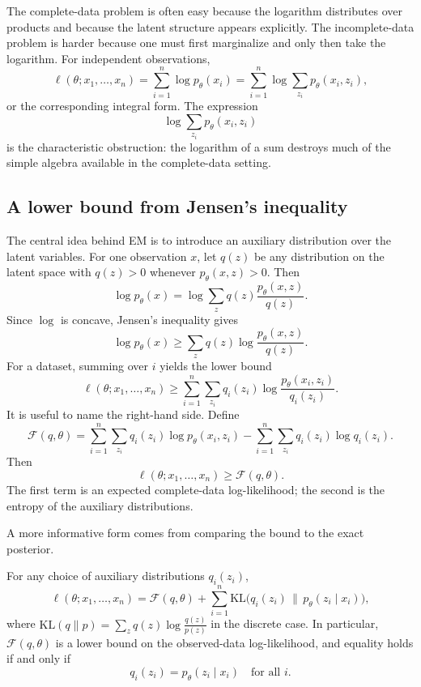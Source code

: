 The complete-data problem is often easy because the logarithm distributes over products and because the latent structure appears explicitly.
The incomplete-data problem is harder because one must first marginalize and only then take the logarithm.
For independent observations,
\[
\ell(\theta; x_1,\dots,x_n)=\sum_{i=1}^n \log p_\theta(x_i)
= \sum_{i=1}^n \log \sum_{z_i} p_\theta(x_i,z_i),
\]
or the corresponding integral form.
The expression
\[
\log \sum_{z_i} p_\theta(x_i,z_i)
\]
is the characteristic obstruction: the logarithm of a sum destroys much of the simple algebra available in the complete-data setting.

\subsection*{A lower bound from Jensen's inequality}

The central idea behind EM is to introduce an auxiliary distribution over the latent variables.
For one observation $x$, let $q(z)$ be any distribution on the latent space with $q(z)>0$ whenever $p_\theta(x,z)>0$.
Then
\[
\log p_\theta(x)
= \log \sum_z q(z)\frac{p_\theta(x,z)}{q(z)}.
\]
Since $\log$ is concave, Jensen's inequality gives
\[
\log p_\theta(x)
\geq
\sum_z q(z)\log \frac{p_\theta(x,z)}{q(z)}.
\]
For a dataset, summing over $i$ yields the lower bound
\[
\ell(\theta; x_1,\dots,x_n)
\geq
\sum_{i=1}^n \sum_{z_i} q_i(z_i) \log \frac{p_\theta(x_i,z_i)}{q_i(z_i)}.
\]
It is useful to name the right-hand side.
Define
\[
\mathcal{F}(q,\theta)
=
\sum_{i=1}^n
\sum_{z_i} q_i(z_i)\log p_\theta(x_i,z_i)
-
\sum_{i=1}^n \sum_{z_i} q_i(z_i)\log q_i(z_i).
\]
Then
\[
\ell(\theta; x_1,\dots,x_n) \geq \mathcal{F}(q,\theta).
\]
The first term is an expected complete-data log-likelihood; the second is the entropy of the auxiliary distributions.

A more informative form comes from comparing the bound to the exact posterior.

\begin{proposition}
For any choice of auxiliary distributions $q_i(z_i)$,
\[
\ell(\theta; x_1,\dots,x_n)
=
\mathcal{F}(q,\theta)
+
\sum_{i=1}^n \mathrm{KL}\bigl(q_i(z_i)\,\|\,p_\theta(z_i\mid x_i)\bigr),
\]
where $\mathrm{KL}(q\|p)=\sum_z q(z)\log \frac{q(z)}{p(z)}$ in the discrete case.
In particular, $\mathcal{F}(q,\theta)$ is a lower bound on the observed-data log-likelihood, and equality holds if and only if
\[
q_i(z_i)=p_\theta(z_i\mid x_i)
\quad\text{for all } i.
\]
\end{proposition}

